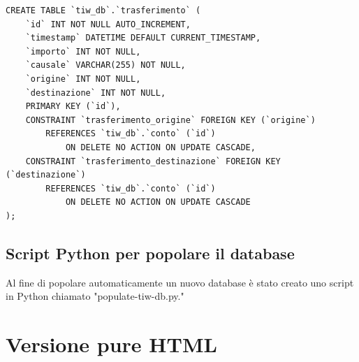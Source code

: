\documentclass{article}
\begin{document}
\begin{verbatim}
CREATE TABLE `tiw_db`.`trasferimento` (
	`id` INT NOT NULL AUTO_INCREMENT,
	`timestamp` DATETIME DEFAULT CURRENT_TIMESTAMP,
	`importo` INT NOT NULL,
	`causale` VARCHAR(255) NOT NULL,
	`origine` INT NOT NULL,
	`destinazione` INT NOT NULL,
	PRIMARY KEY (`id`),
	CONSTRAINT `trasferimento_origine` FOREIGN KEY (`origine`) 
		REFERENCES `tiw_db`.`conto` (`id`)
			ON DELETE NO ACTION ON UPDATE CASCADE,
	CONSTRAINT `trasferimento_destinazione` FOREIGN KEY (`destinazione`) 
		REFERENCES `tiw_db`.`conto` (`id`) 
			ON DELETE NO ACTION ON UPDATE CASCADE
);
\end{verbatim}

\subsection{Script Python per popolare il database}
Al fine di popolare automaticamente un nuovo database è stato creato uno script in Python chiamato "populate-tiw-db.py." 

\section{Versione pure HTML}
\end{document}
